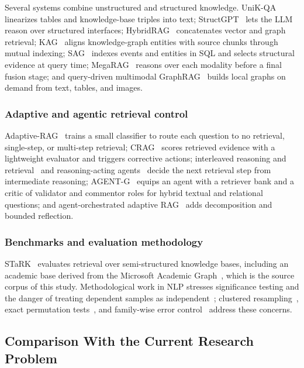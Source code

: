 \documentclass[conference]{IEEEtran}
\begin{document}
Several systems combine unstructured and structured knowledge. UniK-QA~\cite{oguz2022unikqa} linearizes tables and knowledge-base triples into text; StructGPT~\cite{jiang2023structgpt} lets the LLM reason over structured interfaces; HybridRAG~\cite{sarmah2024hybridrag} concatenates vector and graph retrieval; KAG~\cite{liang2024kag} aligns knowledge-graph entities with source chunks through mutual indexing; SAG~\cite{wu2026sag} indexes events and entities in SQL and selects structural evidence at query time; MegaRAG~\cite{hsiao2025megarag} reasons over each modality before a final fusion stage; and query-driven multimodal GraphRAG~\cite{bu2025qdmm} builds local graphs on demand from text, tables, and images.

\subsubsection{Adaptive and agentic retrieval control}

Adaptive-RAG~\cite{jeong2024adaptive} trains a small classifier to route each question to no retrieval, single-step, or multi-step retrieval; CRAG~\cite{yan2024crag} scores retrieved evidence with a lightweight evaluator and triggers corrective actions; interleaved reasoning and retrieval~\cite{trivedi2023ircot} and reasoning-acting agents~\cite{yao2023react} decide the next retrieval step from intermediate reasoning; AGENT-G~\cite{agentg2025} equips an agent with a retriever bank and a critic of validator and commentor roles for hybrid textual and relational questions; and agent-orchestrated adaptive RAG~\cite{maharjan2026agent} adds decomposition and bounded reflection.

\subsubsection{Benchmarks and evaluation methodology}

STaRK~\cite{wu2024stark} evaluates retrieval over semi-structured knowledge bases, including an academic base derived from the Microsoft Academic Graph~\cite{wang2020mag}, which is the source corpus of this study. Methodological work in NLP stresses significance testing and the danger of treating dependent samples as independent~\cite{dror2018}; clustered resampling~\cite{cameron2008}, exact permutation tests~\cite{good2005}, and family-wise error control~\cite{holm1979} address these concerns.

\subsection{Comparison With the Current Research Problem}
\end{document}
